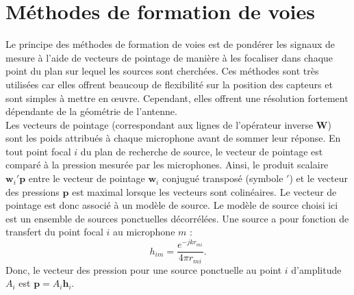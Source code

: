 \section{Méthodes de formation de voies}

Le principe des méthodes de formation de voies est de pondérer les signaux de mesure à l'aide de vecteurs de pointage de manière à les focaliser dans chaque point du plan sur lequel les sources sont cherchées.
Ces méthodes sont très utilisées car elles offrent beaucoup de flexibilité sur la position des capteurs et sont simples à mettre en œuvre. Cependant, elles offrent une résolution fortement dépendante de la géométrie de l'antenne.\\
Les vecteurs de pointage (correspondant aux lignes de l'opérateur inverse $\bm{W}$) sont les poids attribués à chaque microphone avant de sommer leur réponse.  En tout point focal $i$ du plan de recherche de source, le vecteur de pointage est comparé à la pression mesurée par les microphones. Ainsi, le produit scalaire $\bm{w}_i'\bm{p}$ entre le vecteur de pointage $\bm{w}_i$ conjugué transposé (symbole $'$) et le vecteur des pressions $\bm{p}$ est maximal lorsque les vecteurs sont colinéaires. Le vecteur de pointage est donc associé à un modèle de source. Le modèle de source choisi ici est un ensemble de sources ponctuelles décorrélées. Une source a pour fonction de transfert du point focal $i$ au microphone $m$ : 
\begin{equation}
	h_{im}=\frac{e^{-jkr_{mi}}}{4\pi r_{mi}}.
\end{equation}
Donc, le vecteur des pression pour une source ponctuelle au point $i$ d'amplitude $A_i$ est $\bm{p}=A_i\bm{h}_i$.\\



